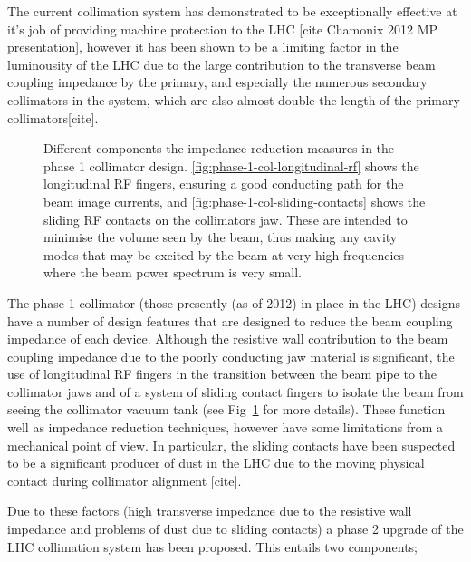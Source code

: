The current collimation system has demonstrated to be exceptionally effective at it's job of providing machine protection to the LHC [cite Chamonix 2012 MP presentation], however it has been shown to be a limiting factor in the luminousity of the LHC due to the large contribution to the transverse beam coupling impedance by the primary, and especially the numerous secondary collimators in the system, which are also almost double the length of the primary collimators[cite]. 

\begin{figure}
\subfigure[]{
\label{fig:phase-1-col-longitudinal-rf}
}
\subfigure[]{
\label{fig:phase-1-col-sliding-contacts}
}
\label{fig:phase-1-rf}
\caption{Different components the impedance reduction measures in the phase 1 collimator design. \ref{fig:phase-1-col-longitudinal-rf} shows the longitudinal RF fingers, ensuring a good conducting path for the beam image currents, and \ref{fig:phase-1-col-sliding-contacts} shows the sliding RF contacts on the collimators jaw. These are intended to minimise the volume seen by the beam, thus making any cavity modes that may be excited by the beam at very high frequencies where the beam power spectrum is very small.}
\end{figure}

The phase 1 collimator (those presently (as of 2012) in place in the LHC) designs have a number of design features that are designed to reduce the beam coupling impedance of each device. Although the resistive wall contribution to the beam coupling impedance due to the poorly conducting jaw material is significant, the use of longitudinal RF fingers in the transition between the beam pipe to the collimator jaws and of a system of sliding contact fingers to isolate the beam from seeing the collimator vacuum tank (see Fig~\ref{fig:phase-1-rf} for more details). These function well as impedance reduction techniques, however have some limitations from a mechanical point of view. In particular, the sliding contacts have been suspected to be a significant producer of dust in the LHC due to the moving physical contact during collimator alignment [cite]. 

Due to these factors (high transverse impedance due to the resistive wall impedance and problems of dust due to sliding contacts) a phase 2 upgrade of the LHC collimation system has been proposed. This entails two components;

